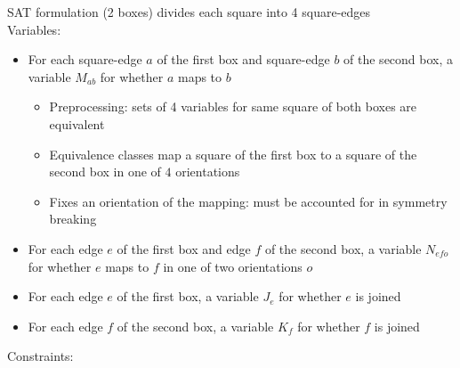\documentclass{article}
\begin{document}
SAT formulation (2 boxes) divides each square into 4 square-edges \\
Variables:
\begin{itemize}
\item
  For each square-edge $a$ of the first box and square-edge $b$ of the second box,
  a variable $M_{ab}$ for whether $a$ maps to $b$
  \begin{itemize}
  \item
    Preprocessing: sets of 4 variables for same square of both boxes are equivalent
  \item
    Equivalence classes map a square of the first box to a square of the second box
    in one of $4$ orientations
  \item
    Fixes an orientation of the mapping: must be accounted for in symmetry breaking
  \end{itemize}
\item
  For each edge $e$ of the first box and edge $f$ of the second box,
  a variable $N_{efo}$ for whether $e$ maps to $f$
  in one of two orientations $o$
\item
  For each edge $e$ of the first box, a variable $J_e$ for whether $e$ is joined
\item
  For each edge $f$ of the second box, a variable $K_f$ for whether $f$ is joined
\end{itemize}
Constraints:
\end{document}
